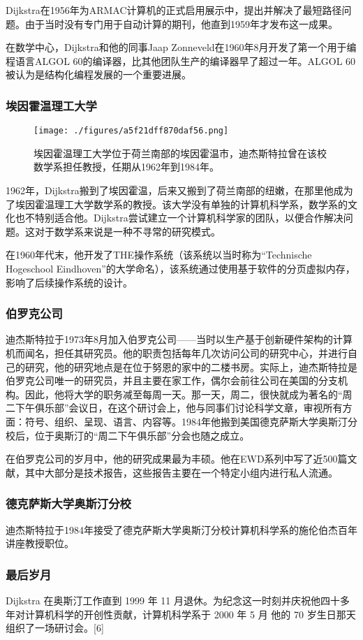 Dijkstra在1956年为ARMAC计算机的正式启用展示中，提出并解决了最短路径问题。由于当时没有专门用于自动计算的期刊，他直到1959年才发布这一成果。

在数学中心，Dijkstra和他的同事Jaap Zonneveld在1960年8月开发了第一个用于编程语言ALGOL 60的编译器，比其他团队生产的编译器早了超过一年。ALGOL 60被认为是结构化编程发展的一个重要进展。
\subsubsection{埃因霍温理工大学}
\begin{figure}[ht]
\centering
\texttt{[image: ./figures/a5f21dff870daf56.png]}
\caption{埃因霍温理工大学位于荷兰南部的埃因霍温市，迪杰斯特拉曾在该校数学系担任教授，任期从1962年到1984年。} \label{fig_ACHR_2}
\end{figure}
1962年，Dijkstra搬到了埃因霍温，后来又搬到了荷兰南部的纽嫩，在那里他成为了埃因霍温理工大学数学系的教授。该大学没有单独的计算机科学系，数学系的文化也不特别适合他。Dijkstra尝试建立一个计算机科学家的团队，以便合作解决问题。这对于数学系来说是一种不寻常的研究模式。

在1960年代末，他开发了THE操作系统（该系统以当时称为“Technische Hogeschool Eindhoven”的大学命名），该系统通过使用基于软件的分页虚拟内存，影响了后续操作系统的设计。
\subsubsection{伯罗克公司}  
迪杰斯特拉于1973年8月加入伯罗克公司——当时以生产基于创新硬件架构的计算机而闻名，担任其研究员。他的职责包括每年几次访问公司的研究中心，并进行自己的研究，他的研究地点是在位于努恩的家中的二楼书房。实际上，迪杰斯特拉是伯罗克公司唯一的研究员，并且主要在家工作，偶尔会前往公司在美国的分支机构。因此，他将大学的职务减至每周一天。那一天，周二，很快就成为著名的“周二下午俱乐部”会议日，在这个研讨会上，他与同事们讨论科学文章，审视所有方面：符号、组织、呈现、语言、内容等。1984年他搬到美国德克萨斯大学奥斯汀分校后，位于奥斯汀的“周二下午俱乐部”分会也随之成立。

在伯罗克公司的岁月中，他的研究成果最为丰硕。他在EWD系列中写了近500篇文献，其中大部分是技术报告，这些报告主要在一个特定小组内进行私人流通。
\subsubsection{德克萨斯大学奥斯汀分校}
迪杰斯特拉于1984年接受了德克萨斯大学奥斯汀分校计算机科学系的施伦伯杰百年讲座教授职位。
\subsubsection{最后岁月}  
Dijkstra 在奥斯汀工作直到 1999 年 11 月退休。为纪念这一时刻并庆祝他四十多年对计算机科学的开创性贡献，计算机科学系于 2000 年 5 月 他的 70 岁生日那天组织了一场研讨会。[6]  

